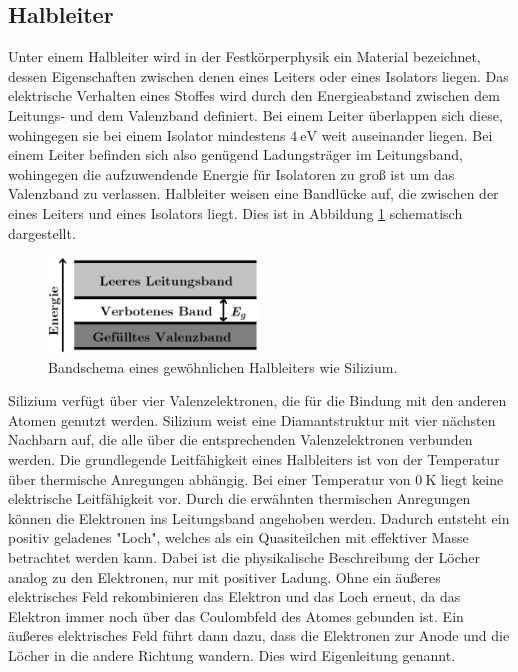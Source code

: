 \subsection{Halbleiter}

Unter einem Halbleiter wird in der Festkörperphysik ein Material bezeichnet, dessen Eigenschaften zwischen denen eines Leiters oder eines Isolators liegen.
Das elektrische Verhalten eines Stoffes wird durch den Energieabstand zwischen dem Leitungs- und dem Valenzband definiert.
Bei einem Leiter überlappen sich diese, wohingegen sie bei einem Isolator mindestens $\SI{4}{\electronvolt}$ weit auseinander liegen.
Bei einem Leiter befinden sich also genügend Ladungsträger im Leitungsband, wohingegen die aufzuwendende Energie für Isolatoren zu groß ist um das Valenzband zu verlassen.
Halbleiter weisen eine Bandlücke auf, die zwischen der eines Leiters und eines Isolators liegt.
Dies ist in Abbildung \ref{fig:bandschema} schematisch dargestellt.

\begin{figure}
  \centering
  \includegraphics[width=0.5\textwidth]{content/graphics/Bandluecke.png}
  \caption{Bandschema eines gewöhnlichen Halbleiters wie Silizium.}
  \label{fig:bandschema}
\end{figure}

Silizium verfügt über vier Valenzelektronen, die für die Bindung mit den anderen Atomen genutzt werden.
Silizium weist eine Diamantstruktur mit vier nächsten Nachbarn auf, die alle über die entsprechenden Valenzelektronen verbunden werden.
Die grundlegende Leitfähigkeit eines Halbleiters ist von der Temperatur über thermische Anregungen abhängig.
Bei einer Temperatur von $\SI{0}{\kelvin}$ liegt keine elektrische Leitfähigkeit vor.
Durch die erwähnten thermischen Anregungen können die Elektronen ins Leitungsband angehoben werden.
Dadurch entsteht ein positiv geladenes "Loch", welches als ein Quasiteilchen mit effektiver Masse betrachtet werden kann.
Dabei ist die physikalische Beschreibung der Löcher analog zu den Elektronen, nur mit positiver Ladung.
Ohne ein äußeres elektrisches Feld rekombinieren das Elektron und das Loch erneut, da das Elektron immer noch über das Coulombfeld des Atomes gebunden ist.
Ein äußeres elektrisches Feld führt dann dazu, dass die Elektronen zur Anode und die Löcher in die andere Richtung wandern.
Dies wird Eigenleitung genannt.

